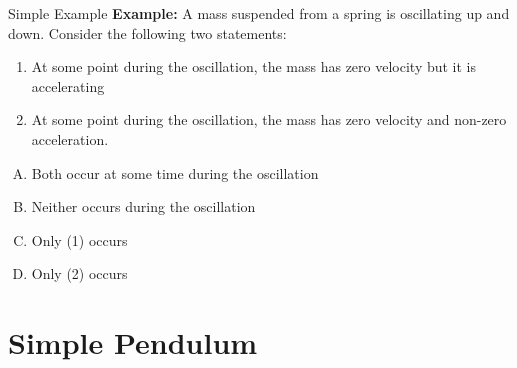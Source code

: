 \documentclass[12pt,compress,aspectratio=169]{beamer}
\begin{document}
\begin{frame}{Simple Example}
  \textbf{Example:} A mass suspended from a spring is oscillating up and
  down. Consider the following two statements:
  \begin{enumerate}
  \item At some point during the oscillation, the mass has zero velocity but it
    is accelerating
  \item At some point during the oscillation, the mass has zero velocity and
    non-zero acceleration.
  \end{enumerate}

  \begin{enumerate}[(A)]
  \item Both occur at some time during the oscillation
  \item Neither occurs during the oscillation
  \item Only (1) occurs
  \item Only (2) occurs
  \end{enumerate}
\end{frame}






\section{Simple Pendulum}
\end{document}
